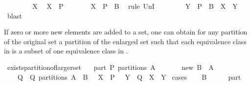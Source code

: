 \begin{isabellebody}
\ \ \isamarkupfalse%
\isanewline
\ \ \ \ \isamarkupfalse%
\ X\ \isamarkupfalse%
\ {\isachardoublequoteopen}X\ {\isasymin}\ P{\isachardoublequoteclose}\isanewline
\ \ \ \ \isamarkupfalse%
\ \isamarkupfalse%
\ {\isachardoublequoteopen}X\ {\isasymin}\ P\ {\isasymunion}\ {\isacharbraceleft}B{\isacharbraceright}{\isachardoublequoteclose}\ \isamarkupfalse%
\ {\isacharparenleft}rule\ UnI{}{\isacharparenright}\isanewline
\ \ \ \ \isamarkupfalse%
\ \isamarkupfalse%
\ {\isachardoublequoteopen}{\isasymexists}\ Y\ {\isasymin}\ P\ {\isasymunion}\ {\isacharbraceleft}B{\isacharbraceright}\ {\isachardot}\ X\ {\isasymsubseteq}\ Y{\isachardoublequoteclose}\ \isamarkupfalse%
\ blast\isanewline
\ \ \isamarkupfalse%
\isanewline
{}\isamarkupfalse%
%
\endisatagproof
{\isafoldproof}%
%
\isadelimproof
%
\endisadelimproof
%
\begin{isamarkuptext}%
If zero or more new elements are added to a set,
  one can obtain for any partition  of the original set
  a partition  of the enlarged set such that each equivalence class in  is a 
  subset of one equivalence class in .%
\end{isamarkuptext}%
\isamarkuptrue%
\isamarkupfalse%
\ exists{\isacharunderscore}partition{\isacharunderscore}of{\isacharunderscore}larger{\isacharunderscore}set{\isacharcolon}\isanewline
\ \ \ part{\isacharcolon}\ {\isachardoublequoteopen}P\ partitions\ A{\isachardoublequoteclose}\isanewline
\ \ \ \ \ \ \ new{\isacharcolon}\ {\isachardoublequoteopen}B\ {\isasyminter}\ A\ {\isacharequal}\ {\isacharbraceleft}{\isacharbraceright}{\isachardoublequoteclose}\isanewline
\ \ \ {\isachardoublequoteopen}{\isasymexists}\ Q\ {\isachardot}\ Q\ partitions\ {\isacharparenleft}A\ {\isasymunion}\ B{\isacharparenright}\ {\isasymand}\ {\isacharparenleft}{\isasymforall}\ X\ {\isasymin}\ P\ {\isachardot}\ {\isasymexists}\ Y\ {\isasymin}\ Q\ {\isachardot}\ X\ {\isasymsubseteq}\ Y{\isacharparenright}{\isachardoublequoteclose}\isanewline
%
\isadelimproof
%
\endisadelimproof
%
\isatagproof
{}\isamarkupfalse%
\ cases\isanewline
\ \ \isamarkupfalse%
\ {\isachardoublequoteopen}B\ {\isacharequal}\ {\isacharbraceleft}{\isacharbraceright}{\isachardoublequoteclose}\isanewline
\ \ \isamarkupfalse%
\ part\ \isamarkupfalse%

\end{isabellebody}
